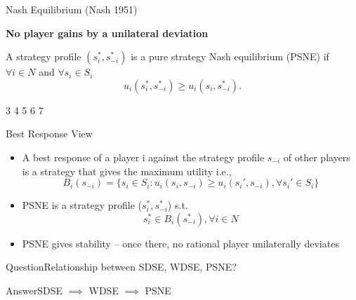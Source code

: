 \documentclass[10pt,aspectratio=169]{beamer}
\newcommand{\question}[1]{\begin{alertblock}{Question}{#1}\end{alertblock} }
\newcommand{\answer}[1]{\begin{block}{Answer}{#1}\end{block} }
\newcommand{\greenblock}[2]{\begin{exampleblock}{#1}{#2}\end{exampleblock} }
\begin{document}
\begin{frame}{Nash Equilibrium (Nash 1951)}
    
    \greenblock{}{
    \begin{center}
        \bf No player gains by a unilateral deviation
    \end{center}
    }
    \pause

\begin{definition}
    A strategy profile $(s_i^{*}, s_{-i}^{*})$ is a pure strategy Nash equilibrium (PSNE) if $\forall i \in N$ and $\forall s_i \in S_i$
    \[u_i(s_i^{*}, s_{-i}^{*}) \geqslant u_i(s_i, s_{-i}^{*}).\]
\end{definition}

\pause
\begin{center}
    \begin{matrixgame}[player names={Friend 1, Friend 2}, w=2, h=1]
    3 
    4 
    5 
    6 
    7 \end{matrixgame}
\end{center}
\end{frame}

\begin{frame}{Best Response View}
\begin{itemize}
    \item A best response of a player i against the strategy profile $s_{-i}$ of other players is a strategy that gives the maximum utility i.e., 
\[B_i(s_{-i})= \{s_i \in S_i:  u_i(s_i, s_{-i}) \geq u_i(s_i', s_{-i}), \forall s_i' \in S_i\}\]
\item PSNE is a strategy profile ($s_i^{*}, s_{-i}^{*}$) s.t. 
\[ s_i^{*} \in B_i(s_{-i}^{*}), \forall i \in N \]
\item PSNE gives stability -- once there, no rational player unilaterally deviates
\end{itemize}
\pause
\question{Relationship between SDSE, WDSE, PSNE?}
\pause 
\answer{SDSE $\implies$ WDSE $\implies$ PSNE}
\end{frame}


\backmatter
\end{document}
